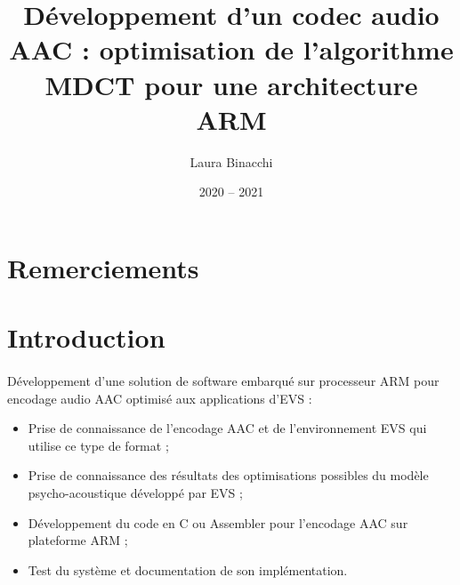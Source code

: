 \documentclass{article}
\title{Développement d'un codec audio AAC : optimisation de l'algorithme MDCT pour une architecture ARM}
\date{2020 -- 2021}
\author{Laura Binacchi}
\begin{document}
    
    \newpage
    \tableofcontents
    \newpage
    \listoffigures

    \newpage
    \section*{Remerciements}

    \newpage
    \section*{Introduction}


    \paragraph{}
    Développement d'une solution de software embarqué sur processeur ARM pour encodage audio AAC optimisé aux applications d'EVS :
    \begin{itemize}
        \item Prise de connaissance de l'encodage AAC et de l'environnement EVS qui utilise ce type de format ;
        \item Prise de connaissance des résultats des optimisations possibles du modèle psycho-acoustique développé par EVS ;
        \item Développement du code en C ou Assembler pour l'encodage AAC sur plateforme ARM ;
        \item Test du système et documentation de son implémentation.
    \end{itemize}

\end{document}
